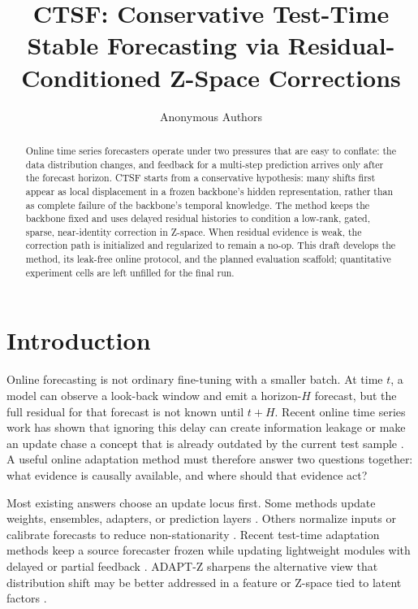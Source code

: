 \documentclass[10pt]{article}
\title{CTSF: Conservative Test-Time Stable Forecasting via Residual-Conditioned Z-Space Corrections}
\author{Anonymous Authors}
\date{}
\begin{document}
\maketitle

\begin{abstract}
Online time series forecasters operate under two pressures that are easy to conflate: the data distribution changes, and feedback for a multi-step prediction arrives only after the forecast horizon. CTSF starts from a conservative hypothesis: many shifts first appear as local displacement in a frozen backbone's hidden representation, rather than as complete failure of the backbone's temporal knowledge. The method keeps the backbone fixed and uses delayed residual histories to condition a low-rank, gated, sparse, near-identity correction in Z-space. When residual evidence is weak, the correction path is initialized and regularized to remain a no-op. This draft develops the method, its leak-free online protocol, and the planned evaluation scaffold; quantitative experiment cells are left unfilled for the final run.
\end{abstract}

\section{Introduction}
Online forecasting is not ordinary fine-tuning with a smaller batch. At time $t$, a model can observe a look-back window and emit a horizon-$H$ forecast, but the full residual for that forecast is not known until $t+H$. Recent online time series work has shown that ignoring this delay can create information leakage or make an update chase a concept that is already outdated by the current test sample \cite{lau2025dsof,zhao2025proceed}. A useful online adaptation method must therefore answer two questions together: what evidence is causally available, and where should that evidence act?

Most existing answers choose an update locus first. Some methods update weights, ensembles, adapters, or prediction layers \cite{pham2023fsnet,wen2023onenet,chen2024solid,lau2025dsof,zhao2025proceed}. Others normalize inputs or calibrate forecasts to reduce non-stationarity \cite{kim2022revin,fan2023dishts,liu2023san,dai2024ddn,ye2024fan}. Recent test-time adaptation methods keep a source forecaster frozen while updating lightweight modules with delayed or partial feedback \cite{kim2025tafas,medeiros2025petsa,lee2025elf}. ADAPT-Z sharpens the alternative view that distribution shift may be better addressed in a feature or Z-space tied to latent factors \cite{huang2026adaptz}.
\end{document}

